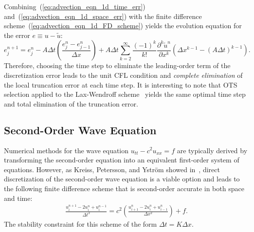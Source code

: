 \documentclass[fleqn,12pt,twoside]{article}
\newcommand{\beq}{\begin{equation}}
\newcommand{\eeq}{\end{equation}}
\newcommand{\bea}{\begin{eqnarray}}
\newcommand{\eea}{\end{eqnarray}}
\def\px{\partial x}
\def\tu{\tilde{u}}
\def\dt{\Delta t}
\def\dx{\Delta x}
\begin{document}
Combining~(\ref{eq:advection_eqn_1d_time_err}) 
and~(\ref{eq:advection_eqn_1d_space_err}) with the finite difference 
scheme~(\ref{eq:advection_eqn_1d_FD_scheme}) yields the evolution
equation for the error $e \equiv u - \tu$:
\beq
  e^{n+1}_j = e^{n}_j 
    - A \dt \left( \frac{e^{n}_j - e^{n}_{j-1}}{\dx} \right) 
    + A \dt \sum_{k=2}^\infty \frac{\left( -1 \right)^k}{k!} 
        \frac{\partial^k \tu^n}{\px^k} 
        \left( \dx^{k-1} - \left( A \dt \right)^{k-1} \right).
  \label{eq:advection_eqn_1d_err_eqn}
\eeq
Therefore, choosing the time step to eliminate the leading-order term 
of the discretization error leads to the unit CFL condition and 
\emph{complete elimination} of the local truncation error at each time step.
It is interesting to note that OTS selection applied to the Lax-Wendroff 
scheme~\cite{leveque_book_2002,leveque_book_1992} yields the same optimal 
time step and total elimination of the truncation error.


\subsection{Second-Order Wave Equation\label{sec:wave_eqn_1d}}
Numerical methods for the wave equation $u_{tt} - c^2 u_{xx} = f$ are typically 
derived by transforming the second-order equation into an equivalent
first-order system of equations.  However, as Kreiss, Petersson, and Ystr\"om 
showed in~\cite{kreiss2002}, direct discretization of the second-order wave 
equation is a viable option and leads to the following finite difference 
scheme that is second-order accurate in both space and time:
\bea
  \frac{u^{n+1}_i - 2 u^n_i + u^{n-1}_i}{\dt^2}
  = c^2 \left( \frac{u^{n}_{i+1} - 2 u^n_i + u^n_{i-1}}{\dx^2} \right)
  + f.
  \label{eq:wave_eqn_KPY}
\eea
The stability constraint for this scheme of the form $\dt = K \dx$.
\end{document}
